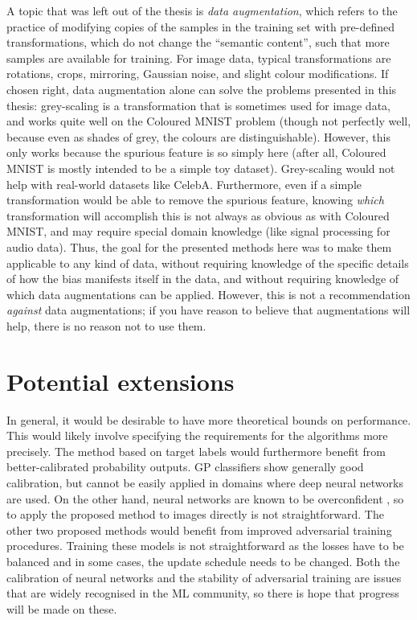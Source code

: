 A topic that was left out of the thesis is \emph{data augmentation}, which refers to the practice
of modifying copies of the samples in the training set with pre-defined transformations, which do
not change the ``semantic content'', such that more samples are available for training. For image
data, typical transformations are rotations, crops, mirroring, Gaussian noise, and slight colour
modifications. If chosen right, data augmentation alone can solve the problems presented in this
thesis: grey-scaling is a transformation that is sometimes used for image data, and works quite
well on the Coloured MNIST problem (though not perfectly well, because even as shades of grey, the
colours are distinguishable). However, this only works because the spurious feature is so simply
here (after all, Coloured MNIST is mostly intended to be a simple toy dataset). Grey-scaling would
not help with real-world datasets like CelebA. Furthermore, even if a simple transformation would
be able to remove the spurious feature, knowing \emph{which} transformation will accomplish this is
not always as obvious as with Coloured MNIST, and may require special domain knowledge (like signal
processing for audio data). Thus, the goal for the presented methods here was to make them
applicable to any kind of data, without requiring knowledge of the specific details of how the bias
manifests itself in the data, and without requiring knowledge of which data augmentations can be
applied. However, this is not a recommendation \emph{against} data augmentations; if you have
reason to believe that augmentations will help, there is no reason not to use them.

\section{Potential extensions}\label{sec:potential-extentions}
%
In general, it would be desirable to have more theoretical bounds on performance. This would likely
involve specifying the requirements for the algorithms more precisely.
The method based on target labels would furthermore benefit from better-calibrated probability
outputs. \acf{GP} classifiers show generally good calibration, but cannot be easily applied in
domains where deep neural networks are used. On the other hand, neural networks are known to be
overconfident \citep[especially when using ReLU activations;][]{hein2019relu}, so to apply the
proposed method to images directly is not straightforward. The other two proposed methods would
benefit from improved adversarial training procedures. Training these models is not straightforward
as the losses have to be balanced and in some cases, the update schedule needs to be changed. Both
the calibration of neural networks and the stability of adversarial training are issues that are
widely recognised in the \ac{ML} community, so there is hope that progress will be made on these.

